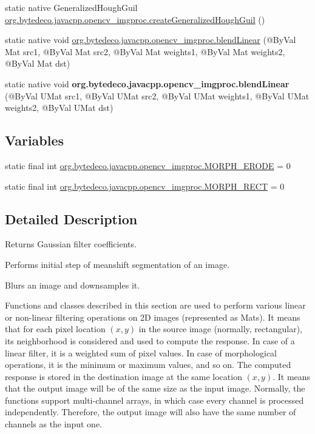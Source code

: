 \begin{DoxyCompactItemize}
\item 
static native Generalized\+Hough\+Guil \hyperlink{group__imgproc__filter_ga5b2d07c2bc26dfd8aa2daeae1b3adfac}{org.\+bytedeco.\+javacpp.\+opencv\+\_\+imgproc.\+create\+Generalized\+Hough\+Guil} ()
\item 
static native void \hyperlink{group__imgproc__filter_gadbbb8985760a3feef02011466803a5a2}{org.\+bytedeco.\+javacpp.\+opencv\+\_\+imgproc.\+blend\+Linear} (@By\+Val Mat src1, @By\+Val Mat src2, @By\+Val Mat weights1, @By\+Val Mat weights2, @By\+Val Mat dst)
\item 
\mbox{\label{group__imgproc__filter_gacecd2a8eb530d74bf8a70ac2497c5945}} 
static native void {\bfseries org.\+bytedeco.\+javacpp.\+opencv\+\_\+imgproc.\+blend\+Linear} (@By\+Val U\+Mat src1, @By\+Val U\+Mat src2, @By\+Val U\+Mat weights1, @By\+Val U\+Mat weights2, @By\+Val U\+Mat dst)
\end{DoxyCompactItemize}
\subsection*{Variables}
\begin{DoxyCompactItemize}
\item 
static final int \hyperlink{group__imgproc__filter_ga0f22b83b4ad2465132087b8d059a2101}{org.\+bytedeco.\+javacpp.\+opencv\+\_\+imgproc.\+M\+O\+R\+P\+H\+\_\+\+E\+R\+O\+DE} = 0
\item 
static final int \hyperlink{group__imgproc__filter_ga8380bc8d565b30f65b81f16987e9edeb}{org.\+bytedeco.\+javacpp.\+opencv\+\_\+imgproc.\+M\+O\+R\+P\+H\+\_\+\+R\+E\+CT} = 0
\end{DoxyCompactItemize}


\subsection{Detailed Description}
Returns Gaussian filter coefficients. 

Performs initial step of meanshift segmentation of an image.

Blurs an image and downsamples it.

Functions and classes described in this section are used to perform various linear or non-\/linear filtering operations on 2D images (represented as Mat\textquotesingle{}s). It means that for each pixel location $(x,y)$ in the source image (normally, rectangular), its neighborhood is considered and used to compute the response. In case of a linear filter, it is a weighted sum of pixel values. In case of morphological operations, it is the minimum or maximum values, and so on. The computed response is stored in the destination image at the same location $(x,y)$. It means that the output image will be of the same size as the input image. Normally, the functions support multi-\/channel arrays, in which case every channel is processed independently. Therefore, the output image will also have the same number of channels as the input one. 

